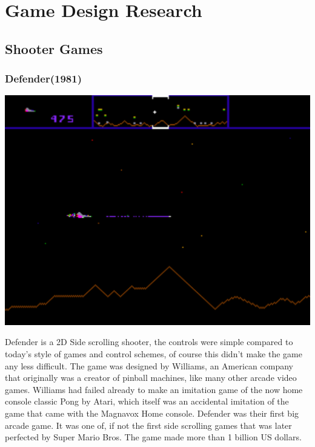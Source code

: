 \documentclass{article}
\begin{document}
\section{Game Design Research}
\subsection{Shooter Games}
\subsubsection{Defender(1981)}
\begin{minipage}{0.4\textwidth}
\includegraphics[width=\linewidth]{defender}
\end{minipage} \hfill
\begin{minipage}{0.55\textwidth}\raggedright
Defender is a 2D Side scrolling shooter, the controls were simple compared to today's style of games and control schemes, of course this didn't make the game any less difficult. \newline \newline
The game was designed by Williams, an American company that originally was a creator of pinball machines, like many other arcade video games.
Williams had failed already to make an imitation game of the now home console classic Pong by Atari, which itself was an accidental imitation of the game that came with the Magnavox Home console. Defender was their first big arcade game. It was one of, if not the first side scrolling  games that was later perfected by Super Mario Bros. The game made more than 1 billion US dollars. \newline
\end{minipage} \newline \newline
\end{document}
